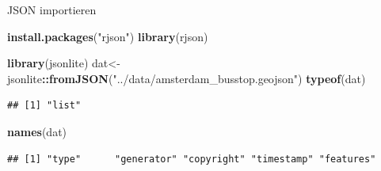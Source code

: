 \documentclass[ignorenonframetext,]{beamer}
\newenvironment{Shaded}{\begin{snugshade}}{\end{snugshade}}
\newcommand{\KeywordTok}[1]{\textcolor[rgb]{0.13,0.29,0.53}{\textbf{#1}}}
\newcommand{\StringTok}[1]{\textcolor[rgb]{0.31,0.60,0.02}{#1}}
\newcommand{\OperatorTok}[1]{\textcolor[rgb]{0.81,0.36,0.00}{\textbf{#1}}}
\newcommand{\NormalTok}[1]{#1}
\begin{document}
\begin{frame}[fragile]{JSON importieren}

\begin{Shaded}
\begin{Highlighting}[]
\KeywordTok{install.packages}\NormalTok{(}\StringTok{"rjson"}\NormalTok{)}
\KeywordTok{library}\NormalTok{(rjson)}
\end{Highlighting}
\end{Shaded}

\begin{Shaded}
\begin{Highlighting}[]
\KeywordTok{library}\NormalTok{(jsonlite)}
\NormalTok{dat<-jsonlite}\OperatorTok{::}\KeywordTok{fromJSON}\NormalTok{(}\StringTok{"../data/amsterdam_busstop.geojson"}\NormalTok{)}
\KeywordTok{typeof}\NormalTok{(dat)}
\end{Highlighting}
\end{Shaded}

\begin{verbatim}
## [1] "list"
\end{verbatim}

\begin{Shaded}
\begin{Highlighting}[]
\KeywordTok{names}\NormalTok{(dat)}
\end{Highlighting}
\end{Shaded}

\begin{verbatim}
## [1] "type"      "generator" "copyright" "timestamp" "features"
\end{verbatim}

\end{frame}
\end{document}
